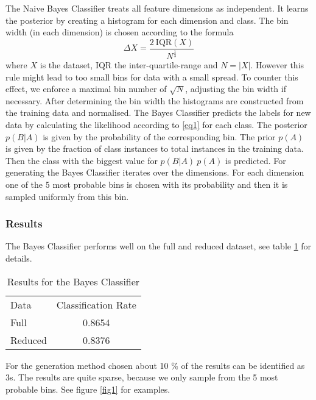 \documentclass{article}
\begin{document}
The Naive Bayes Classifier treats all feature dimensions as independent. It learns the posterior by creating a histogram 
for each dimension and class. The bin width (in each dimension) is chosen according to the formula
\begin{equation}
	\Delta X = \frac{2 ~ \mathrm{IQR}(X)}{N^{\frac{1}{3}}}
\end{equation}
where $X$ is the dataset, IQR the inter-quartile-range and $N = |X|$. However this 
rule might lead to too small bins for data with a small spread. To counter this effect,
we enforce a maximal bin number of $\sqrt{N}$, adjusting the bin width if necessary.
After determining the bin width the histograms are constructed from the training data and normalised.
\newline
The Bayes Classifier predicts the labels for new data by calculating the likelihood according to
\ref{eq1} for each class. The posterior $p(B|A)$ is given by the probability of the corresponding bin.
The prior $p(A)$ is given by the fraction of class instances to total instances in the training data.
Then the class with the biggest value for $p(B|A) ~ p(A)$ is predicted.
\newline
For generating the Bayes Classifier iterates over the dimensions.
For each dimension one of the 5 most probable bins is chosen with its probability and 
then it is sampled uniformly from this bin.

\subsubsection{Results}

The Bayes Classifier performs well on the full and reduced dataset, see table \ref{tab1} for details.
	
\begin{table}[h]
	\centering
	\begin{tabular}{l c}
		Data	&	Classification Rate	\\
		Full	&	0.8654				\\
	 	Reduced & 	0.8376				\\
	\end{tabular}
	\caption{Results for the Bayes Classifier}
	\label{tab1}
\end{table}

For the generation method chosen about 10 \% of the results can be identified as 3s.
The results are quite sparse, because we only sample from the 5 most probable bins.
See figure \ref{fig1} for examples.
\end{document}
